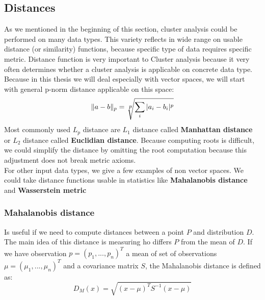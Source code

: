 \subsection{Distances}
As we mentioned in the beginning of this section, cluster analysis could be performed on many data types. This variety reflects in wide range on usable distance (or similarity) functions, because specific type of data requires specific metric. Distance function is very important to Cluster analysis because it very often determines whether a cluster analysis is applicable on concrete data type. Because in this thesis we will deal especially with vector spaces, we will start with general p-norm distance applicable on this space: $$\|a-b\|_p=\sqrt[\leftroot{-1}\uproot{3}\scriptstyle p]{\sum_i |a_i - b_i|^p} $$
Most commonly used $L_p$ distance are $L_1$ distance called \textbf{Manhattan distance} or $L_2$ distance called \textbf{Euclidian distance}.
Because computing roots is difficult, we could simplify the distance by omitting the root computation because this adjustment does not break metric axioms.\\

For other input data types, we give a few examples of non vector spaces. We could take distance functions usable in statistics like \textbf{Mahalanobis distance} and \textbf{Wasserstein metric}

\subsubsection{Mahalanobis distance}
Is useful if we need to compute distances between a point $P$ and distribution $D$. The main idea of this distance is measuring ho differs $P$ from the mean of $D$.
If we have observation $p=(p_1,...,p_n)^T$ a mean of set of observations $\mu=(\mu_1,...,\mu_n)^T$ and a covariance matrix $S$, the Mahalanobis distance is defined as:
$$D_M(x) = \sqrt{(x - \mu)^T S^{-1} (x-\mu)}$$

